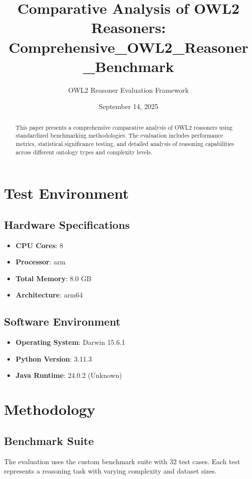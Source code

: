 \documentclass[11pt,a4paper]{{article}}
\title{{Comparative Analysis of OWL2 Reasoners: Comprehensive_OWL2_Reasoner_Benchmark}}
\author{{OWL2 Reasoner Evaluation Framework}}
\date{{September 14, 2025}}
\begin{document}
\maketitle

\begin{abstract}
This paper presents a comprehensive comparative analysis of OWL2 reasoners using standardized benchmarking methodologies. The evaluation includes performance metrics, statistical significance testing, and detailed analysis of reasoning capabilities across different ontology types and complexity levels.
\end{abstract}

\tableofcontents

\newpage

\section{Test Environment}

\subsection{Hardware Specifications}
\begin{itemize}
    \item \textbf{CPU Cores}: 8
    \item \textbf{Processor}: arm
    \item \textbf{Total Memory}: 8.0 GB
    \item \textbf{Architecture}: arm64
\end{itemize}

\subsection{Software Environment}
\begin{itemize}
    \item \textbf{Operating System}: Darwin 15.6.1
    \item \textbf{Python Version}: 3.11.3
    \item \textbf{Java Runtime}: 24.0.2 (Unknown)
\end{itemize}


\section{Methodology}

\subsection{Benchmark Suite}
The evaluation uses the custom benchmark suite with 32 test cases. Each test represents a reasoning task with varying complexity and dataset sizes.
\end{document}
